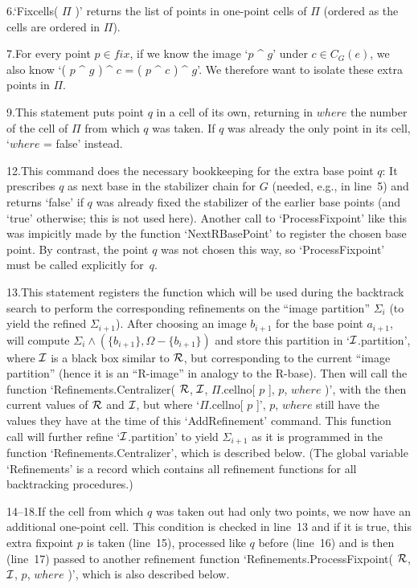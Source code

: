 6.\enspace  `Fixcells( $\Pi$ )' returns the  list of  points in one-point
cells of $\Pi$ (ordered as the cells are ordered in $\Pi$).

7.\enspace For every point $p\in fix$,  if we know the  image `$p$ ^ $g$'
under $c\in C_G(e)$, we also know `( $p$ ^ $g$ ) ^ $c$ = (  $p$ ^ $c$ ) ^
$g$'. We therefore want to isolate these extra points in $\Pi$.

9.\enspace This statement puts point $q$ in a cell  of its own, returning
in $where$ the number of the cell  of $\Pi$ from  which $q$ was taken. If
$q$ was already the only point in its cell, `$where$ = false' instead.

12.\enspace This  command does the   necessary bookkeeping for  the extra
base point $q$:  It prescribes $q$ as next  base in the  stabilizer chain
for $G$ (needed, e.g., in line~5) and  returns `false' if $q$ was already
fixed the  stabilizer of the  earlier base points (and  `true' otherwise;
this is not used here).  Another call to  `ProcessFixpoint' like this was
impicitly  made by the  function  `NextRBasePoint' to register the chosen
base  point. By contrast,  the  point $q$  was  not chosen  this  way, so
`ProcessFixpoint' must be called explicitly for~$q$.

13.\enspace  This statement registers  the   function which will be  used
during the  backtrack search to perform  the corresponding refinements on
the ``image partition'' $\Sigma_i$ (to yield the refined $\Sigma_{i+1}$).
After choosing an image  $b_{i+1}$ for the  base point $a_{i+1}$,  {\GAP}
will compute $\Sigma_i \wedge (\{b_{i+1}\},\Omega-\{b_{i+1}\})$ and store
this partition in `${\cal I}$.partition', where ${\cal I}$  is a black box similar to
${\cal R}$, but  corresponding to the current  ``image partition'' (hence it is
an   ``R-image'' in analogy  to the  R-base). Then {\GAP}   will call the
function `Refinements.Centralizer( ${\cal R}$, ${\cal I}$,  $\Pi$.cellno[ $p$ ], $p$,
$where$  )',  with the  then current values  of ${\cal R}$  and ${\cal I}$, but where
`$\Pi$.cellno[ $p$ ]',  $p$, $where$ still  have the values they  have at
the time of this `AddRefinement' command. This function call will further
refine  `${\cal I}$.partition' to yield $\Sigma_{i+1}$ as  it  is programmed in
the function `Refinements.Centralizer',  which  is described  below. (The
global  variable `Refinements' is  a record which contains all refinement
functions for all backtracking procedures.)

14--18.\enspace If  the cell from which  $q$ was taken  out  had only two
points, we   now have an   additional one-point  cell. This  condition is
checked  in line~13 and if it  is true, this  extra fixpoint $p$ is taken
(line~15), processed like $q$  before   (line~16) and is then   (line~17)
passed to another refinement function `Refinements.ProcessFixpoint( ${\cal R}$,
${\cal I}$, $p$, $where$ )', which is also described below.

